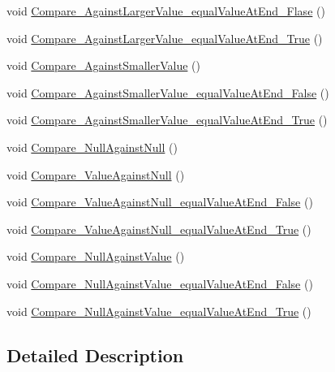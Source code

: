 \begin{DoxyCompactItemize}
void \hyperlink{class_duplicate_key_comparer_test_a32cc02c96311188726974f509d03933c}{Compare\+\_\+\+Against\+Larger\+Value\+\_\+equal\+Value\+At\+End\+\_\+\+Flase} ()
\item 
void \hyperlink{class_duplicate_key_comparer_test_a0d7bd5b3347279b5f8bdf89bcea6a1a2}{Compare\+\_\+\+Against\+Larger\+Value\+\_\+equal\+Value\+At\+End\+\_\+\+True} ()
\item 
void \hyperlink{class_duplicate_key_comparer_test_a489c0312d2a89811bf2ed17c2719919a}{Compare\+\_\+\+Against\+Smaller\+Value} ()
\item 
void \hyperlink{class_duplicate_key_comparer_test_a3fb94554a20641f102c07bdf9e412519}{Compare\+\_\+\+Against\+Smaller\+Value\+\_\+equal\+Value\+At\+End\+\_\+\+False} ()
\item 
void \hyperlink{class_duplicate_key_comparer_test_a7b7d31f1c9f3c29770f55241183dd0da}{Compare\+\_\+\+Against\+Smaller\+Value\+\_\+equal\+Value\+At\+End\+\_\+\+True} ()
\item 
void \hyperlink{class_duplicate_key_comparer_test_a6daf783a96600e2090d7958edfa41e03}{Compare\+\_\+\+Null\+Against\+Null} ()
\item 
void \hyperlink{class_duplicate_key_comparer_test_aee77d2ad72b6afa93b8e318111049808}{Compare\+\_\+\+Value\+Against\+Null} ()
\item 
void \hyperlink{class_duplicate_key_comparer_test_aad66046c431fe309d0697394c1ad4725}{Compare\+\_\+\+Value\+Against\+Null\+\_\+equal\+Value\+At\+End\+\_\+\+False} ()
\item 
void \hyperlink{class_duplicate_key_comparer_test_ad48d766c0fb02ab64593cb95873bc49a}{Compare\+\_\+\+Value\+Against\+Null\+\_\+equal\+Value\+At\+End\+\_\+\+True} ()
\item 
void \hyperlink{class_duplicate_key_comparer_test_a931659da52988d50f1fdceefef0d571d}{Compare\+\_\+\+Null\+Against\+Value} ()
\item 
void \hyperlink{class_duplicate_key_comparer_test_a3997402d9a43f75c391c9433debbbf77}{Compare\+\_\+\+Null\+Against\+Value\+\_\+equal\+Value\+At\+End\+\_\+\+False} ()
\item 
void \hyperlink{class_duplicate_key_comparer_test_af22f04417e414482f832ee5b0a852bbb}{Compare\+\_\+\+Null\+Against\+Value\+\_\+equal\+Value\+At\+End\+\_\+\+True} ()
\end{DoxyCompactItemize}


\subsection{Detailed Description}


